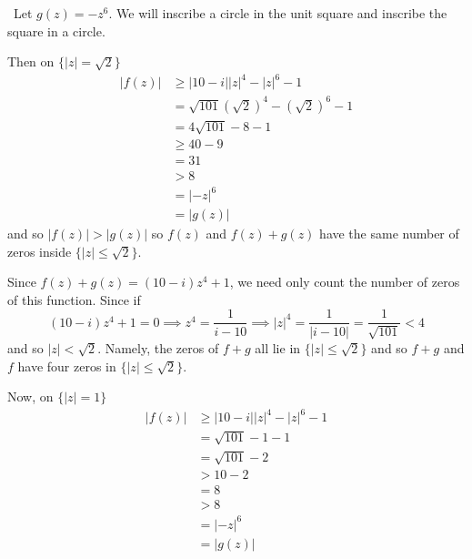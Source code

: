 \documentclass[12pt]{Qual}
\begin{document}
\begin{solution}$\,$
Let $g(z)=-z^6$. We will inscribe a circle in the unit square and inscribe the square in a circle.

\begin{center}
\end{center}

Then on $\{|z|=\sqrt{2}\}$ \begin{align*}
    |f(z)|&\ge |10-i||z|^4-|z|^6-1\\
    &=\sqrt{101}(\sqrt{2})^4-(\sqrt{2})^6-1\\
    &=4\sqrt{101}-8-1\\
    &\ge 40-9\\
    &=31\\
    &>8\\
    &=|-z|^6\\
    &=|g(z)|
\end{align*} and so $|f(z)|>|g(z)|$ so $f(z)$ and $f(z)+g(z)$ have the same number of zeros inside $\{|z|\le\sqrt{2}\}.$

Since $f(z)+g(z)=(10-i)z^4+1$, we need only count the number of zeros of this function. Since if $$(10-i)z^4+1=0\implies z^4=\frac{1}{i-10}\implies |z|^4=\frac{1}{|i-10|}=\frac{1}{\sqrt{101}}<4$$ and so $|z|<\sqrt{2}$. Namely, the zeros of $f+g$ all lie in $\{|z|\le\sqrt{2}\}$ and so $f+g$ and $f$ have four zeros in $\{|z|\le\sqrt{2}\}$.

Now, on $\{|z|=1\}$  \begin{align*}
    |f(z)|&\ge |10-i||z|^4-|z|^6-1\\
    &=\sqrt{101}-1-1\\
    &=\sqrt{101}-2\\
    &> 10-2\\
    &=8\\
    &>8\\
    &=|-z|^6\\
    &=|g(z)|
\end{align*}


\end{solution}
\end{document}
